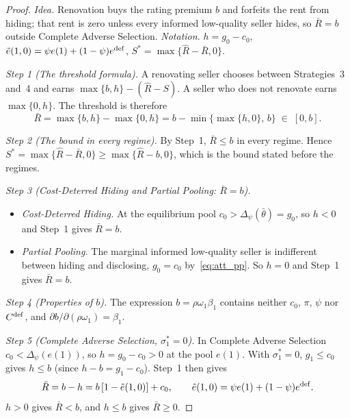 \begin{proof}\upshape
\emph{Idea.} Renovation buys the rating premium $b$ and forfeits the rent from hiding; that rent is zero unless every informed low-quality seller hides, so $\bar R=b$ outside Complete Adverse Selection. \emph{Notation.} $h=g_0-c_0$, $\tilde e(1,0)=\psi e(1)+(1-\psi)e^{\rm def}$, $S^*=\max\{\hat R-\bar R,0\}$.

\emph{Step 1 (The threshold formula).} A renovating seller chooses between Strategies~3 and~4 and earns $\max\{b,h\}-(\hat R-S)$. A seller who does not renovate earns $\max\{0,h\}$. The threshold is therefore
\begin{equation*}
    \bar R=\max\{b,h\}-\max\{0,h\}=b-\min\big\{\max\{h,0\},\,b\big\}\;\in\;[0,b].
\end{equation*}

\emph{Step 2 (The bound in every regime).} By Step~1, $\bar R\le b$ in every regime. Hence $S^*=\max\{\hat R-\bar R,0\}\ge\max\{\hat R-b,0\}$, which is the bound stated before the regimes.

\emph{Step 3 (Cost-Deterred Hiding and Partial Pooling: $\bar R=b$).}
\begin{itemize}
    \item \emph{Cost-Deterred Hiding.} At the equilibrium pool $c_0>\Delta_\psi(\bar\theta)=g_0$, so $h<0$ and Step~1 gives $\bar R=b$.
    \item \emph{Partial Pooling.} The marginal informed low-quality seller is indifferent between hiding and disclosing, $g_0=c_0$ by~\eqref{eq:att_pp}. So $h=0$ and Step~1 gives $\bar R=b$.
\end{itemize}

\emph{Step 4 (Properties of $b$).} The expression $b=\rho\omega_1\beta_1$ contains neither $c_0$, $\pi$, $\psi$ nor $C^{\rm def}$, and $\partial b/\partial(\rho\omega_1)=\beta_1$.

\emph{Step 5 (Complete Adverse Selection, $\sigma_1^*=0$).} In Complete Adverse Selection $c_0<\Delta_\psi(e(1))$, so $h=g_0-c_0>0$ at the pool $e(1)$. With $\sigma_1^*=0$, $g_1\le c_0$ gives $h\le b$ (since $h-b=g_1-c_0$). Step~1 then gives
\begin{equation*}
    \bar R=b-h=b\,[1-\tilde e(1,0)]+c_0,\qquad \tilde e(1,0)=\psi e(1)+(1-\psi)e^{\rm def}.
\end{equation*}
$h>0$ gives $\bar R<b$, and $h\le b$ gives $\bar R\ge0$.


\end{proof}
